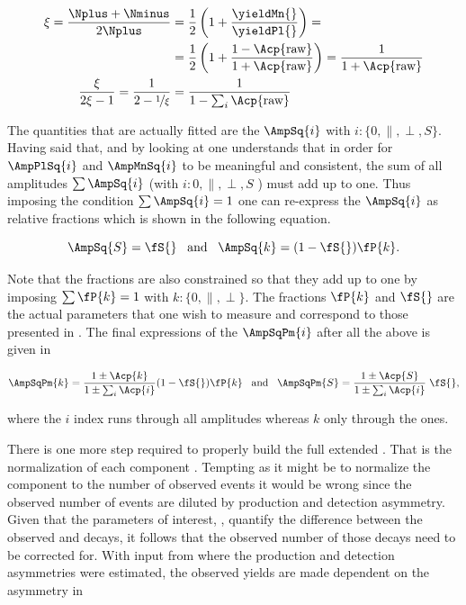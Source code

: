 \begin{align}
\xi = \frac{\Nplus+\Nminus}{2\Nplus} &= \frac{1}{2}\left( 1 + \frac{\yieldMn{}}{\yieldPl{}}\right) = \nonumber \\
                                     &= \frac{1}{2}\left( 1 + \frac{1-\Acp{\text{raw}}}{1+\Acp{\text{raw}}}\right) =
                                        \frac{1}{1+\Acp{\text{raw}}}  \\
\frac{\xi}{2\xi-1} = \frac{1}{2-\nicefrac{1}{\xi}} &= \frac{1}{1-\sum_i\Acp{\text{raw}}}
\label{amp_norms}
\end{align}

The quantities that are actually fitted are the $\AmpSq{i}$ with $i:\{0,\parallel,\perp,S\}$. Having said that, and by looking at 
one understands that in order for $\AmpPlSq{i}$ and $\AmpMnSq{i}$ to be meaningful and consistent, the sum of all amplitudes $\sum\AmpSq{i}$
(with $i:{0,\parallel,\perp,S}$ ) must add up to one. Thus imposing the condition $\sum\AmpSq{i} = 1$ one can re-express the $\AmpSq{i}$
as relative fractions which is shown in the following equation.

\begin{equation}
\AmpSq{S} = \fS{} \;\;\;\text{and}\;\;\; \AmpSq{k} = (1-\fS{})\fP{k}.
\label{amps_param}
\end{equation}

Note that the \pwave fractions are also constrained so that they add up to one by imposing $\sum\fP{k}=1$ with $k:\{0,\parallel,\perp\}$.
The fractions $\fP{k}$ and $\fS{}$ are the actual parameters that one wish to measure and correspond to those presented in .
The final expressions of the $\AmpSqPm{i}$ after all the above is given in 

\begin{equation}
\AmpSqPm{k} = \frac{1\pm\Acp{k}}{1\pm\sum_i\Acp{i}}  (1-\fS{})\fP{k}  \;\;\; \text{and}\;\;\; \AmpSqPm{S} = \frac{1\pm\Acp{S}}{1\pm\sum_i\Acp{i}} \; \fS{},
\label{amps_final}
\end{equation}

\noindent where the $i$ index runs through all amplitudes whereas $k$ only through the \pwave ones.

There is one more step required to properly build the full extended \pdf. That is the normalization of each component \pdf. Tempting as it might be to
normalize the component \pdfs to the number of observed events it would be wrong since the observed number of events are diluted by production and detection
asymmetry. Given that the parameters of interest, \ACP, quantify the difference between the observed \BsbarJpsiKst and \BsJpsiKst decays, it follows that
the observed  number of those decays need to be corrected for. With input from  where the production and detection
asymmetries were estimated, the observed yields are made dependent on the \ACP asymmetry in 

